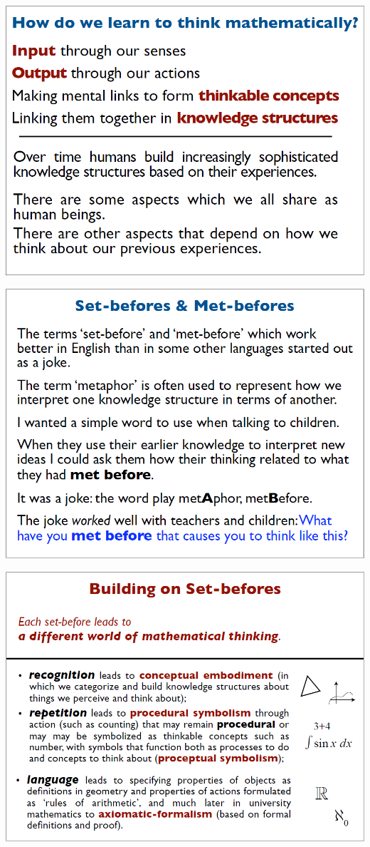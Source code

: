 \documentclass{article}
\begin{document}
\hspace{\fill}%
\begin{minipage}[t]{0.32\linewidth}%
	\includegraphics[width=\textwidth]{david_tall/dt2.png}%
	
	\includegraphics[width=\textwidth]{david_tall/dt5.png}%
	
	\includegraphics[width=\textwidth]{david_tall/dt8.png}%
	

\end{minipage}
\end{document}
